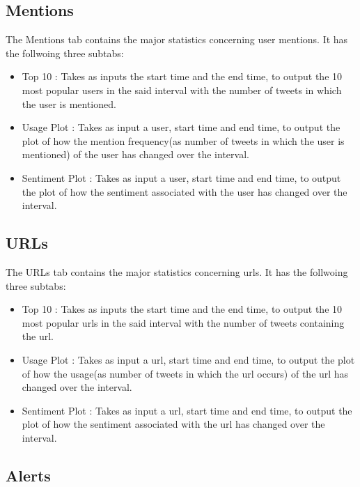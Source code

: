 \documentclass[letterpaper,10pt,english]{sphinxmanual}
\begin{document}
\subsection{Mentions}
\label{\detokenize{dashboard_website:mentions}}
The Mentions tab contains the major statistics concerning user mentions. It has the follwoing three subtabs:
\begin{itemize}
\item {} 
Top 10 : Takes as inputs the start time and the end time, to output the 10 most popular users in the said interval with the number of tweets in which the user is mentioned.

\item {} 
Usage Plot : Takes as input a user, start time and end time, to output the plot of how the mention frequency(as number of tweets in which the user is mentioned) of the user has changed over the interval.

\item {} 
Sentiment Plot : Takes as input a user, start time and end time, to output the plot of how the sentiment associated with the user has changed over the interval.

\end{itemize}


\subsection{URLs}
\label{\detokenize{dashboard_website:urls}}
The URLs tab contains the major statistics concerning urls. It has the follwoing three subtabs:
\begin{itemize}
\item {} 
Top 10 : Takes as inputs the start time and the end time, to output the 10 most popular urls in the said interval with the number of tweets containing the url.

\item {} 
Usage Plot : Takes as input a url, start time and end time, to output the plot of how the usage(as number of tweets in which the url occurs) of the url has changed over the interval.

\item {} 
Sentiment Plot : Takes as input a url, start time and end time, to output the plot of how the sentiment associated with the url has changed over the interval.

\end{itemize}


\subsection{Alerts}
\label{\detokenize{dashboard_website:alerts}}
\end{document}
